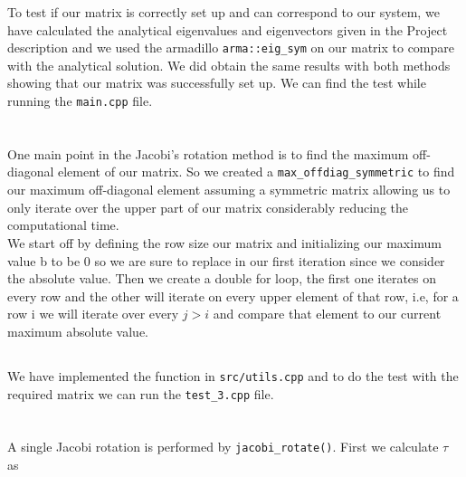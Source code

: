 \documentclass[a4paper,10pt,english]{article}
\begin{document}
			To test if our matrix is correctly set up and can correspond to our system, we have 
			calculated the analytical eigenvalues and eigenvectors given in the
Project description and we used the armadillo \lstinline{arma::eig_sym} on our
matrix to compare with the analytical solution. We did obtain the same results
with both methods showing that our matrix was successfully set up. We can find
the test while running the \lstinline{main.cpp} file.
			
			\section{} %
			\subsection{}
			One main point in the Jacobi's rotation method is to find the maximum off-diagonal element of our matrix. So we created a \lstinline{max_offdiag_symmetric} to find our maximum off-diagonal element assuming a symmetric matrix allowing us to only iterate over the upper part of our matrix considerably reducing the computational time. \\
			
			We start off by defining the row size our matrix and initializing our maximum value b to be 0 so we are sure to replace in our first iteration since we consider the absolute value. Then we create a double for loop, the first one iterates on every row and the other will iterate on every upper element of that row, i.e, for a row i we will iterate over every $j>i$ and compare that element to our current maximum absolute value.  
			
			
			\subsection{}
			We have implemented the function in \lstinline{src/utils.cpp} and to do the test with the required matrix we can run the \lstinline{test_3.cpp} file.
			
			
			\section{} %
			\subsection{}
			A single Jacobi rotation is performed by
			\lstinline{jacobi_rotate()}. First we calculate $\tau$ as
\end{document}
